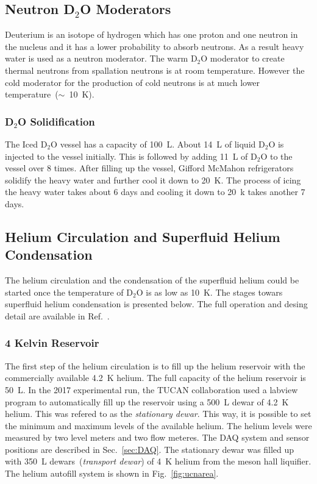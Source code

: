 \subsection{Neutron D$_2$O Moderators}
Deuterium is an isotope of hydrogen which has one proton and one
neutron in the nucleus and it has a lower probability to absorb
neutrons. As a result heavy water is used as a neutron moderator. The
warm D$_2$O moderator to create thermal neutrons from spallation
neutrons is at room temperature. However the cold moderator for the
production of cold neutrons is at much lower
temperature~($\sim$~10~K).

\subsubsection{D$_2$O Solidification}
The Iced D$_2$O vessel has a capacity of 100~L. About 14~L of liquid
D$_2$O is injected to the vessel initially. This is followed by adding 11~L of
D$_2$O to the vessel over 8 times.  After filling up the vessel,
Gifford McMahon refrigerators solidify the heavy water and further
cool it down to 20~K. The process of icing the heavy water takes about
6 days and cooling it down to 20~k takes another 7 days.


\subsection{Helium Circulation and Superfluid Helium Condensation}
The helium circulation and the condensation of the superfluid helium
could be started once the temperature of D$_2$O is as low as 10~K. The
stages towars superfluid helium condensation is presented below. The
full operation and desing detail are available in
Ref.~\cite{matsumiya_thesis}.

\subsubsection{4 Kelvin Reservoir}
The first step of the helium circulation is to fill up the helium
reservoir with the commercially available 4.2~K helium. The full
capacity of the helium reservoir is 50~L. In the 2017 experimental
run, the TUCAN collaboration used a labview program to automatically
fill up the reservoir using a 500~L dewar of 4.2~K helium. This was
refered to as the {\it{stationary dewar}}. This way, it is possible to
set the minimum and maximum levels of the available helium. The helium
levels were measured by two level meters and two flow meteres. The DAQ
system and sensor positions are described in Sec.~\ref{sec:DAQ}.  The
stationary dewar was filled up with 350~L dewars~({\it{transport
    dewar}}) of 4~K helium from the meson hall liquifier. The helium
autofill system is shown in Fig.~\ref{fig:ucnarea}.

